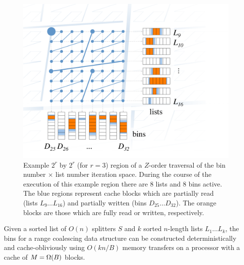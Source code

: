 \begin{figure}[h]
\includegraphics[scale=.35]{bin-construction.pdf}
\caption{Example $2^r$ by $2^r$ (for $r=3$) region of a $Z$-order traversal of 
the bin number $\times$ list number iteration space.  During the course of the
execution of this example region there are $8$ lists and $8$ 
bins active.  The blue regions represent cache blocks which
are partially read (lists $L_9 \ldots L_{16}$) and partially written 
(bins $D_{25} \ldots D_{32}$).  The orange blocks are those which are fully read or 
written, respectively.}
\label{fig:bin_construction} 
\end{figure}


\begin{theorem}
Given a sorted list of $O(n)$ splitters $S$ and $k$ sorted $n$-length lists 
$L_1 \ldots L_k$, the bins for a range coalescing data structure can be constructed
deterministically and cache-obliviously using $O(kn/B)$ memory transfers on a 
processor with a cache of $M=\Omega \mathopen{}\left(B\right)\mathclose{}$ blocks.
\end{theorem}

